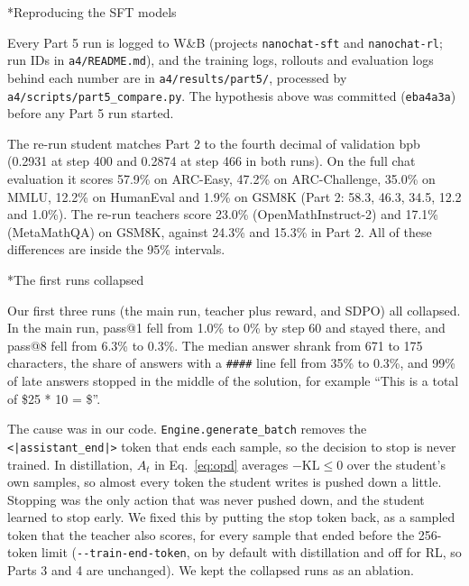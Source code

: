 \documentclass[11pt]{article}
\makeatletter
\renewcommand\subsection{\@startsection{subsection}{2}{\z@}{0.6em}{0.2em}{\normalsize\bfseries}}
\newcommand{\code}[1]{\texttt{#1}}
\makeatother
\begin{document}
\subsection*{Reproducing the SFT models}

Every Part 5 run is logged to W\&B (projects \code{nanochat-sft} and \code{nanochat-rl}; run IDs in \code{a4/README.md}), and the training logs, rollouts and evaluation logs behind each number are in \code{a4/results/part5/}, processed by \code{a4/scripts/part5\_compare.py}. The hypothesis above was committed (\code{eba4a3a}) before any Part 5 run started.

The re-run student matches Part 2 to the fourth decimal of validation bpb (0.2931 at step 400 and 0.2874 at step 466 in both runs). On the full chat evaluation it scores 57.9\% on ARC-Easy, 47.2\% on ARC-Challenge, 35.0\% on MMLU, 12.2\% on HumanEval and 1.9\% on GSM8K (Part 2: 58.3, 46.3, 34.5, 12.2 and 1.0\%). The re-run teachers score 23.0\% (OpenMathInstruct-2) and 17.1\% (MetaMathQA) on GSM8K, against 24.3\% and 15.3\% in Part 2. All of these differences are inside the 95\% intervals.

\subsection*{The first runs collapsed}

Our first three runs (the main run, teacher plus reward, and SDPO) all collapsed. In the main run, pass@1 fell from 1.0\% to 0\% by step 60 and stayed there, and pass@8 fell from 6.3\% to 0.3\%. The median answer shrank from 671 to 175 characters, the share of answers with a \code{\#\#\#\#} line fell from 35\% to 0.3\%, and 99\% of late answers stopped in the middle of the solution, for example ``This is a total of \$25 * 10 = \$''.

The cause was in our code. \code{Engine.generate\_batch} removes the \code{<|assistant\_end|>} token that ends each sample, so the decision to stop is never trained. In distillation, $A_t$ in Eq.~\ref{eq:opd} averages $-\mathrm{KL} \le 0$ over the student's own samples, so almost every token the student writes is pushed down a little. Stopping was the only action that was never pushed down, and the student learned to stop early. We fixed this by putting the stop token back, as a sampled token that the teacher also scores, for every sample that ended before the 256-token limit (\code{-{}-train-end-token}, on by default with distillation and off for RL, so Parts 3 and 4 are unchanged). We kept the collapsed runs as an ablation.
\end{document}
